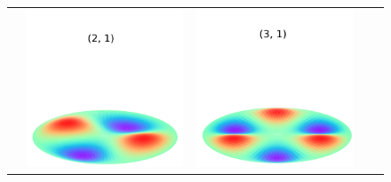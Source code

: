\documentclass[a4paper]{ctexart}
\begin{document}
\begin{figure}[htbp]
\begin{tabular}{ccccc}
			& \includegraphics[scale=0.4]{2_1.png} & \includegraphics[scale=0.4]{3_1.png}

\end{tabular}
\end{figure}
\end{document}
